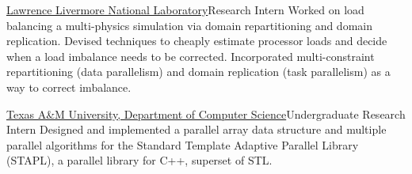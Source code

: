 		{\href{http://www.llnl.gov}{Lawrence Livermore National Laboratory}}{Research Intern}{}{}
		{Worked on load balancing a multi-physics simulation via domain repartitioning
		and domain replication.  Devised techniques to cheaply estimate processor loads and decide
		when a load imbalance needs to be corrected.  Incorporated multi-constraint
		repartitioning (data parallelism) and domain replication (task parallelism)
		as a way to correct imbalance.
		}

		{\href{http://www.cse.tamu.edu/}{Texas A\&M University, Department of Computer Science}}{Undergraduate Research Intern}{}{}
		{Designed and implemented a parallel array data structure and multiple
		parallel algorithms for the Standard Template Adaptive Parallel Library
		(STAPL), a parallel library for C++, superset of STL.}
